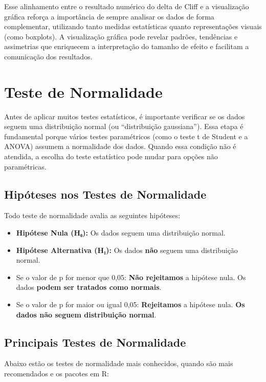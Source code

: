 \documentclass[
]{book}
\begin{document}
Esse alinhamento entre o resultado numérico do delta de Cliff e a visualização gráfica reforça a importância de sempre analisar os dados de forma complementar, utilizando tanto medidas estatísticas quanto representações visuais (como boxplots). A visualização gráfica pode revelar padrões, tendências e assimetrias que enriquecem a interpretação do tamanho de efeito e facilitam a comunicação dos resultados.

\chapter{Teste de Normalidade}\label{teste-de-normalidade}

Antes de aplicar muitos testes estatísticos, é importante verificar se os dados seguem uma distribuição normal (ou ``distribuição gaussiana''). Essa etapa é fundamental porque vários testes paramétricos (como o teste t de Student e a ANOVA) assumem a normalidade dos dados. Quando essa condição não é atendida, a escolha do teste estatístico pode mudar para opções não paramétricas.

\section{Hipóteses nos Testes de Normalidade}\label{hipuxf3teses-nos-testes-de-normalidade}

Todo teste de normalidade avalia as seguintes hipóteses:

\begin{itemize}
\item
  \textbf{Hipótese Nula (H₀):} Os dados seguem uma distribuição normal.
\item
  \textbf{Hipótese Alternativa (H₁):} Os dados \textbf{não} seguem uma distribuição normal.
\item
  Se o valor de p for menor que 0,05: \textbf{Não rejeitamos} a hipótese nula. Os dados \textbf{podem ser tratados como normais}.
\item
  Se o valor de p for maior ou igual 0,05: \textbf{Rejeitamos} a hipótese nula. \textbf{Os dados não seguem distribuição normal}.
\end{itemize}

\section{Principais Testes de Normalidade}\label{principais-testes-de-normalidade}

Abaixo estão os testes de normalidade mais conhecidos, quando são mais recomendados e os pacotes em R:
\end{document}
